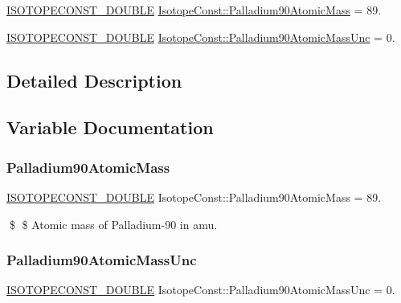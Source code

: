 \begin{DoxyCompactItemize}
\item 
\mbox{\hyperlink{group___isotope_const-_macros_ga8f45a7272ce02c0b4c65c44636ed719a}{I\+S\+O\+T\+O\+P\+E\+C\+O\+N\+S\+T\+\_\+\+D\+O\+U\+B\+LE}} \mbox{\hyperlink{group___isotope_const-_palladium-_pd90_gaf1e1802528f556f9c0e3724434e2bd14}{Isotope\+Const\+::\+Palladium90\+Atomic\+Mass}} = 89.
\item 
\mbox{\hyperlink{group___isotope_const-_macros_ga8f45a7272ce02c0b4c65c44636ed719a}{I\+S\+O\+T\+O\+P\+E\+C\+O\+N\+S\+T\+\_\+\+D\+O\+U\+B\+LE}} \mbox{\hyperlink{group___isotope_const-_palladium-_pd90_gab4bf9d9c2edd7284145926f81b297d04}{Isotope\+Const\+::\+Palladium90\+Atomic\+Mass\+Unc}} = 0.
\end{DoxyCompactItemize}


\subsection{Detailed Description}


\subsection{Variable Documentation}
\mbox{\label{group___isotope_const-_palladium-_pd90_gaf1e1802528f556f9c0e3724434e2bd14}} 
\subsubsection{\texorpdfstring{Palladium90\+Atomic\+Mass}{Palladium90AtomicMass}}
{\footnotesize\ttfamily \mbox{\hyperlink{group___isotope_const-_macros_ga8f45a7272ce02c0b4c65c44636ed719a}{I\+S\+O\+T\+O\+P\+E\+C\+O\+N\+S\+T\+\_\+\+D\+O\+U\+B\+LE}} Isotope\+Const\+::\+Palladium90\+Atomic\+Mass = 89.}

\$ \$ Atomic mass of Palladium-\/90 in amu. \mbox{\label{group___isotope_const-_palladium-_pd90_gab4bf9d9c2edd7284145926f81b297d04}} 
\subsubsection{\texorpdfstring{Palladium90\+Atomic\+Mass\+Unc}{Palladium90AtomicMassUnc}}
{\footnotesize\ttfamily \mbox{\hyperlink{group___isotope_const-_macros_ga8f45a7272ce02c0b4c65c44636ed719a}{I\+S\+O\+T\+O\+P\+E\+C\+O\+N\+S\+T\+\_\+\+D\+O\+U\+B\+LE}} Isotope\+Const\+::\+Palladium90\+Atomic\+Mass\+Unc = 0.}


